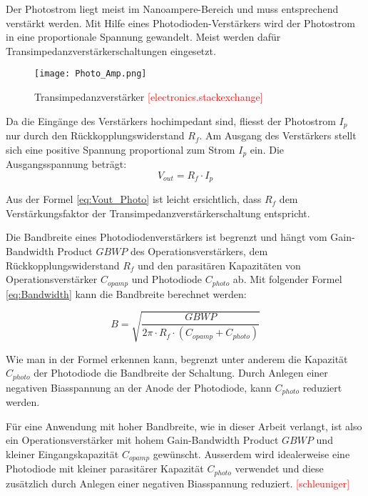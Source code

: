 Der Photostrom liegt meist im Nanoampere-Bereich und muss entsprechend verstärkt werden. Mit Hilfe eines Photodioden-Verstärkers wird der Photostrom in eine proportionale Spannung gewandelt. Meist werden dafür Transimpedanzverstärkerschaltungen eingesetzt.
\begin{figure}[h]
	\centering
	\texttt{[image: Photo\_Amp.png]}
	\caption{Transimpedanzverstärker \textcolor{red}{[electronics.stackexchange]}}\label{fig:Photo_Amp}
\end{figure}

Da die Eingänge des Verstärkers hochimpedant sind, fliesst der Photostrom $ I_{p} $ nur durch den Rückkopplungswiderstand $ R_{f} $. Am Ausgang des Verstärkers stellt sich eine positive Spannung proportional zum Strom $ I_{p} $ ein. Die Ausgangsspannung beträgt:
\begin{equation}\label{eq:Vout_Photo}
V_{out}=R_{f} \cdot I_{p}
\end{equation}

Aus der Formel \ref{eq:Vout_Photo} ist leicht ersichtlich, dass $ R_{f} $ dem Verstärkungsfaktor der Transimpedanzverstärkerschaltung entspricht.

Die Bandbreite eines Photodiodenverstärkers ist begrenzt und hängt vom Gain-Bandwidth Product $GBWP$ des Operationsverstärkers, dem Rückkopplungswiderstand $ R_{f} $ und den parasitären Kapazitäten von Operationsverstärker $ C_{opamp} $ und Photodiode $ C_{photo} $ ab. Mit folgender Formel \ref{eq:Bandwidth} kann die Bandbreite berechnet werden:

\begin{equation}\label{eq:Bandwidth}
B=\sqrt{\frac{GBWP}{2\pi\cdot R_{f}\cdot (C_{opamp}+C_{photo})}}
\end{equation}

Wie man in der Formel erkennen kann, begrenzt unter anderem die Kapazität $ C_{photo} $ der Photodiode die Bandbreite der Schaltung. Durch Anlegen einer negativen Biasspannung an der Anode der Photodiode, kann $ C_{photo} $ reduziert werden.

Für eine Anwendung mit hoher Bandbreite, wie in dieser Arbeit verlangt, ist also ein Operationsverstärker mit hohem Gain-Bandwidth Product $GBWP$ und kleiner Eingangskapazität $ C_{opamp} $ gewünscht. Ausserdem wird idealerweise eine Photodiode mit kleiner parasitärer Kapazität $ C_{photo} $ verwendet und diese zusätzlich durch Anlegen einer negativen Biasspannung reduziert. \textcolor{red}{[schleuniger]}
